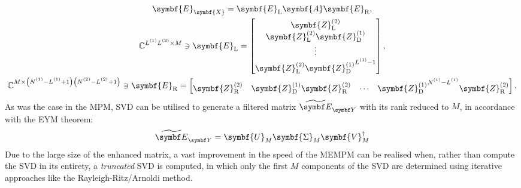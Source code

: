 \begin{subequations}
    \begin{gather}
        \symbf{E}_{\symbf{X}} =
        \symbf{E}_{\text{L}}
        \symbf{A}
        \symbf{E}_{\text{R}},\\
        \mathbb{C}^{\Lone \Ltwo \times M} \ni
        \symbf{E}_{\text{L}} =
        \begin{bmatrix}
            \symbf{Z}^{(2)}_{\text{L}} \\
            \symbf{Z}^{(2)}_{\text{L}} \symbf{Z}^{(1)}_{\text{D}} \\
            \vdots \\
            \symbf{Z}^{(2)}_{\text{L}} {\symbf{Z}^{(1)}_{\text{D}}}^{\Lone - 1} \\
        \end{bmatrix},\label{eq:EL}\\
        \mathbb{C}^{M \times \left(\None - \Lone + 1\right)\left(\Ntwo - \Ltwo + 1\right)} \ni
        \symbf{E}_{\text{R}} =
        \begin{bmatrix}
            \symbf{Z}^{(2)}_{\text{R}} &
            \symbf{Z}^{(1)}_{\text{D}} \symbf{Z}^{(2)}_{\text{R}} &
            \cdots &
            {\symbf{Z}^{(1)}_{\text{D}}}^{\None - \Lone} \symbf{Z}^{(2)}_{\text{R}} \\
        \end{bmatrix}.
    \end{gather}
\end{subequations}
As was the case in the \ac{MPM}, \ac{SVD} can be utilised to generate a
filtered matrix $\EYtilde$ with its rank reduced to $M$, in accordance with the
\ac{EYM} theorem:
\begin{equation}
    \EYtilde =
        \symbf{U}_M^{\vphantom{\dagger}}
        \symbf{\Sigma}_M^{\vphantom{\dagger}}
        \symbf{V}_M^{\dagger}
\end{equation}
Due to the large size of the enhanced matrix, a vast improvement
in the speed of the \ac{MEMPM} can be realised when, rather than compute the
\ac{SVD} in its entirety, a \emph{truncated} \ac{SVD} is computed, in
which only the first $M$ components of the \ac{SVD} are
determined using iterative approaches like the Rayleigh-Ritz/Arnoldi
method\cite{Arnoldi1951,svds}.

